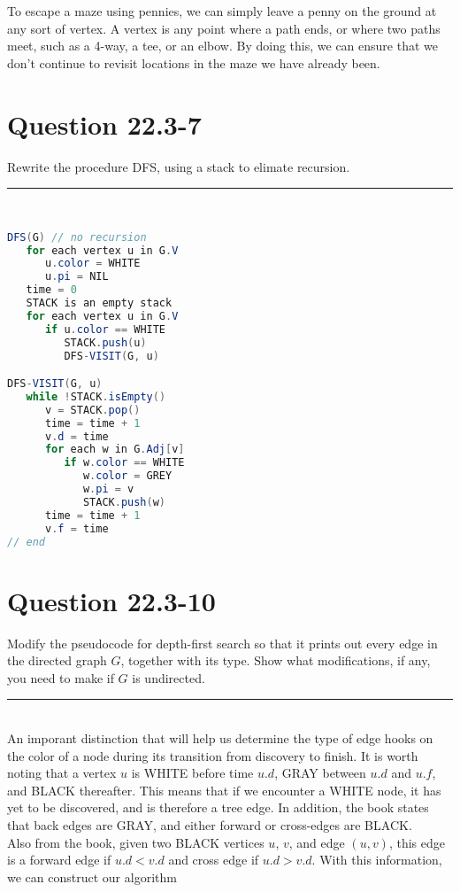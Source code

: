 \documentclass[20pt]{article} %
\begin{document}
To escape a maze using pennies, we can simply leave a penny on the ground at any sort of vertex.  A vertex is any point where a path ends, or where two paths meet, such as a 4-way, a tee, or an elbow.  By doing this, we can ensure that we don't continue to revisit locations in the maze we have already been.
\newpage
\section{Question 22.3-7} 
Rewrite the procedure DFS, using a stack to elimate recursion. \\
\noindent\rule{2cm}{0.4pt} \\

\begin{lstlisting}[language=java]
DFS(G) // no recursion
   for each vertex u in G.V
      u.color = WHITE
      u.pi = NIL
   time = 0
   STACK is an empty stack
   for each vertex u in G.V
      if u.color == WHITE
         STACK.push(u)
         DFS-VISIT(G, u)

DFS-VISIT(G, u)
   while !STACK.isEmpty()
      v = STACK.pop()
      time = time + 1
      v.d = time
      for each w in G.Adj[v]
         if w.color == WHITE
            w.color = GREY
            w.pi = v
            STACK.push(w)
      time = time + 1
      v.f = time
// end
\end{lstlisting}

\newpage
\section{Question 22.3-10} 
Modify the pseudocode for depth-first search so that it prints out every edge in the directed graph $G$, together with its type. Show what modifications, if any, you need to make if $G$ is undirected. \\
\noindent\rule{2cm}{0.4pt} \\

An imporant distinction that will help us determine the type of edge hooks on the color of a node during its transition from discovery to finish.  It is worth noting that a vertex $u$ is WHITE before time $u.d$, GRAY between $u.d$ and $u.f$, and BLACK thereafter.  This means that if we encounter a WHITE node, it has yet to be discovered, and is therefore a tree edge.  In addition, the book states that back edges are GRAY, and either forward or cross-edges are BLACK.  \\

Also from the book, given two BLACK vertices $u$, $v$, and edge $(u,v)$, this edge is a forward edge if $u.d < v.d$ and cross edge if $u.d > v.d$.  With this information, we can construct our algorithm
\end{document}
